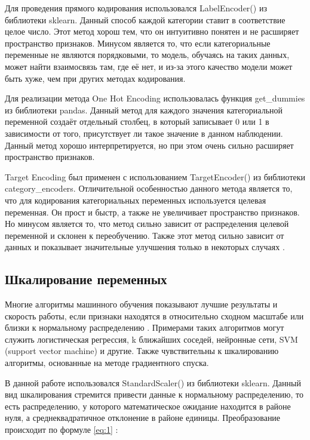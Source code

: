 \documentclass[14pt]{mmcs_article}
\begin{document}
Для проведения прямого кодирования использовался LabelEncoder() из библиотеки sklearn. Данный способ каждой категории ставит в соответствие целое число. Этот метод хорош тем, что он интуитивно понятен и не расширяет пространство признаков. Минусом является то, что если категориальные переменные не являются порядковыми, то модель, обучаясь на таких данных, может найти взаимосвязь там, где её нет, и из-за этого качество модели может быть хуже, чем при других методах кодирования.

Для реализации метода One Hot Encoding использовалась функция get\_dummies из библиотеки pandas. Данный метод для каждого значения категориальной переменной создаёт отдельный столбец, в который записывает 0 или 1 в зависимости от того, присутствует ли такое значение в данном наблюдении. Данный метод хорошо интерпретируется, но при этом очень сильно расширяет пространство признаков. 

Target Encoding был применен с использованием TargetEncoder() из библиотеки category\_encoders. Отличительной особенностью данного метода является то, что для кодирования категориальных переменных используется целевая переменная. Он прост и быстр, а также не увеличивает пространство признаков. Но минусом является то, что метод сильно зависит от распределения целевой переменной и склонен к переобучению. Также этот метод сильно зависит от данных и показывает значительные улучшения только в некоторых случаях \cite{lib:encoding}. 


\subsection{Шкалирование переменных}

Многие алгоритмы машинного обучения показывают лучшие результаты и скорость работы, если признаки находятся в относительно сходном масштабе или близки к нормальному распределению \cite{lib:standardize}.  Примерами таких алгоритмов могут служить логистическая регрессия, k ближайших соседей, нейронные сети, SVM (support vector machine) и другие. Также чувствительны к шкалированию алгоритмы, основанные на методе градиентного спуска.

В данной работе использовался StandardScaler() из библиотеки sklearn. Данный вид шкалирования стремится привести данные к нормальному распределению, то есть распределению, у которого математическое ожидание находится в районе нуля, а среднеквадратичное отклонение в районе единицы. Преобразование происходит по формуле \ref{eq:1} \cite{lib:sklearnstandard}:
\end{document}
